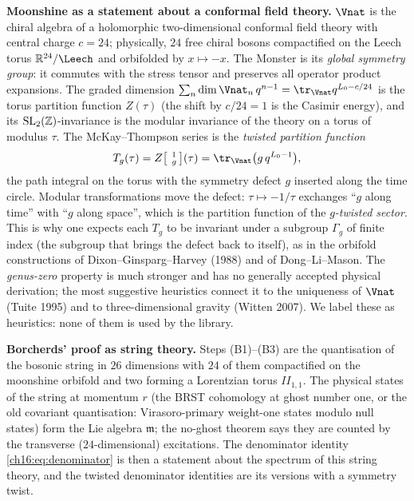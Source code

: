 \begin{physics}
\textbf{Moonshine as a statement about a conformal field theory.}  $\Vnat$ is the chiral algebra of a holomorphic
two-dimensional conformal field theory with central charge $c=24$; physically, $24$ free chiral bosons compactified
on the Leech torus $\chsixteenR^{24}/\Leech$ and orbifolded by $x\mapsto-x$.  The Monster is its \emph{global symmetry group}:
it commutes with the stress tensor and preserves all operator product expansions.  The graded dimension
$\sum_n\dim\Vnat_n\,q^{n-1}=\tr_{\Vnat}q^{L_0-c/24}$ is the torus partition function $Z(\tau)$ (the shift by
$c/24=1$ is the Casimir energy), and its $\mathrm{SL}_2(\mathbb{Z})$-invariance is the modular invariance of the theory on a torus
of modulus $\tau$.  The McKay--Thompson series is the \emph{twisted partition function}
\begin{equation*}
  T_g(\tau)=Z\bigl[\,{}^{\;1}_{\;g}\,\bigr](\tau)=\tr_{\Vnat}\bigl(g\,q^{L_0-1}\bigr),
\end{equation*}
the path integral on the torus with the symmetry defect $g$ inserted along the time circle.  Modular
transformations move the defect: $\tau\mapsto-1/\tau$ exchanges ``$g$ along time'' with ``$g$ along space'', which is
the partition function of the \emph{$g$-twisted sector}.  This is why one expects each $T_g$ to be invariant under a
subgroup $\Gamma_g$ of finite index (the subgroup that brings the defect back to itself), as in the orbifold
constructions of Dixon--Ginsparg--Harvey (1988) and of Dong--Li--Mason.  The \emph{genus-zero} property is much
stronger and has no generally accepted physical derivation; the most suggestive heuristics connect it to the
uniqueness of $\Vnat$ (Tuite 1995) and to three-dimensional gravity (Witten 2007).  We label these as heuristics: none
of them is used by the library.

\textbf{Borcherds' proof as string theory.}  Steps (B1)--(B3) are the quantisation of the bosonic string in $26$
dimensions with $24$ of them compactified on the moonshine orbifold and two forming a Lorentzian torus $I\!I_{1,1}$.
The physical states of the string at momentum $r$ (the BRST cohomology at ghost number one, or the old covariant
quantisation: Virasoro-primary weight-one states modulo null states) form the Lie algebra $\mathfrak m$; the no-ghost
theorem says they are counted by the transverse ($24$-dimensional) excitations.  The denominator identity
\eqref{ch16:eq:denominator} is then a statement about the spectrum of this string theory, and the twisted
denominator identities are its versions with a symmetry twist.
\end{physics}

